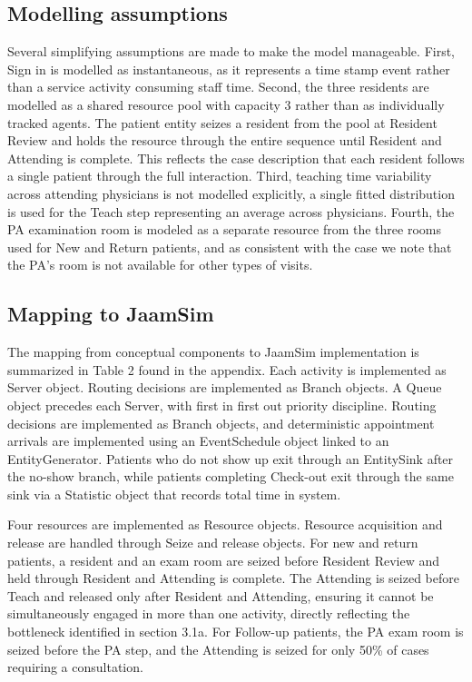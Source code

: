 \subsection{Modelling assumptions}

Several simplifying assumptions are made to make the model manageable. First, Sign in is modelled as instantaneous, as it represents a time stamp event rather than a service activity consuming staff time. Second, the three residents are modelled as a shared resource pool with capacity 3 rather than as individually tracked agents. The patient entity seizes a resident from the pool at Resident Review and holds the resource through the entire sequence until Resident and Attending is complete. This reflects the case description that each resident follows a single patient through the full interaction. Third, teaching time variability across attending physicians is not modelled explicitly, a single fitted distribution is used for the Teach step representing an average across physicians. Fourth, the PA examination room is modeled as a separate resource from the three rooms used for New and Return patients, and as consistent with the case we note that the PA's room is not available for other types of visits.

\subsection{Mapping to JaamSim}

The mapping from conceptual components to JaamSim implementation is summarized in Table 2 found in the appendix. Each activity is implemented as Server object. Routing decisions are implemented as Branch objects. A Queue object precedes each Server, with first in first out priority discipline. Routing decisions are implemented as Branch objects, and deterministic appointment arrivals are implemented using an EventSchedule object linked to an EntityGenerator. Patients who do not show up exit through an EntitySink after the no-show branch, while patients completing Check-out exit through the same sink via a Statistic object that records total time in system. 

Four resources are implemented as Resource objects. Resource acquisition and release are handled through Seize and release objects. For new and return patients, a resident and an exam room are seized before Resident Review and held through Resident and Attending is complete. The Attending is seized before Teach and released only after Resident and Attending, ensuring it cannot be simultaneously engaged in more than one activity, directly reflecting the bottleneck identified in section 3.1a. For Follow-up patients, the PA exam room is seized before the PA step, and the Attending is seized for only 50\% of cases requiring a consultation. 